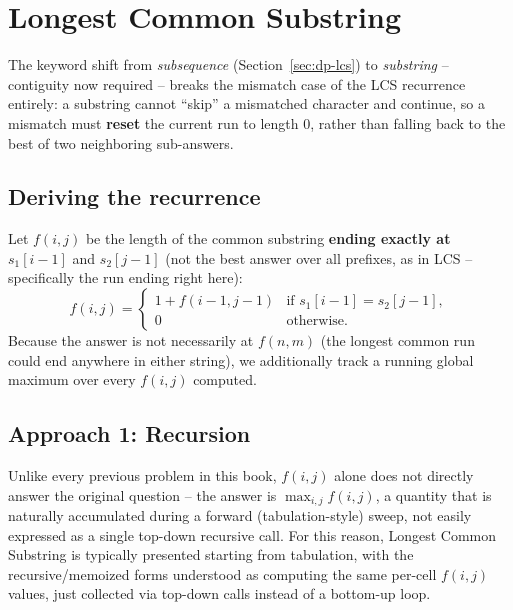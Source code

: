 \section{Longest Common Substring}
\label{sec:dp-longest-common-substring}


\begin{patternbox}
The keyword shift from \emph{subsequence} (Section~\ref{sec:dp-lcs}) to
\emph{substring} -- contiguity now required -- breaks the mismatch case
of the LCS recurrence entirely: a substring cannot ``skip'' a
mismatched character and continue, so a mismatch must \textbf{reset} the
current run to length $0$, rather than falling back to the best of two
neighboring sub-answers.
\end{patternbox}

\subsection*{Deriving the recurrence}

Let $f(i,j)$ be the length of the common substring \textbf{ending
exactly at} $s_1[i-1]$ and $s_2[j-1]$ (not the best answer over all
prefixes, as in LCS -- specifically the run ending right here):
\[
  f(i,j) =
  \begin{cases}
    1 + f(i{-}1,j{-}1) & \text{if } s_1[i{-}1] = s_2[j{-}1], \\
    0 & \text{otherwise.}
  \end{cases}
\]
Because the answer is not necessarily at $f(n,m)$ (the longest common
run could end anywhere in either string), we additionally track a
running global maximum over every $f(i,j)$ computed.

\subsection*{Approach 1: Recursion}

\begin{ideabox}
Unlike every previous problem in this book, $f(i,j)$ alone does not
directly answer the original question -- the answer is
$\max_{i,j} f(i,j)$, a quantity that is naturally accumulated during a
forward (tabulation-style) sweep, not easily expressed as a single
top-down recursive call. For this reason, Longest Common Substring is
typically presented starting from tabulation, with the recursive/memoized
forms understood as computing the same per-cell $f(i,j)$ values, just
collected via top-down calls instead of a bottom-up loop.
\end{ideabox}

